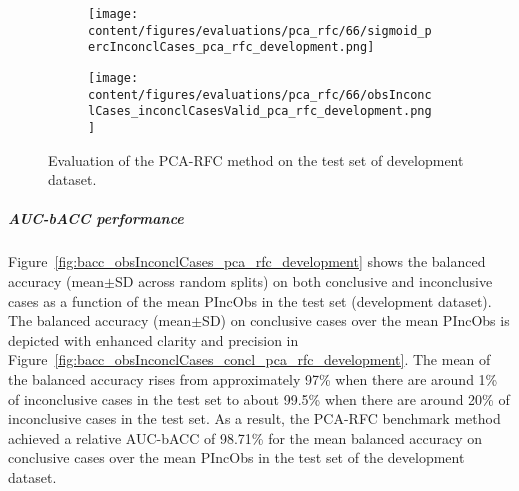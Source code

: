 \begin{figure}[ht]
  \begin{subfigure}{0.48\textwidth}
    \centering
    \texttt{[image: content/figures/evaluations/pca\_rfc/66/sigmoid\_percInconclCases\_pca\_rfc\_development.png]}
    \label{fig:pca_rfc_percInconclCases_development}
  \end{subfigure}
  \hfill
  \begin{subfigure}{0.495\textwidth}
    \centering
    \texttt{[image: content/figures/evaluations/pca\_rfc/66/obsInconclCases\_inconclCasesValid\_pca\_rfc\_development.png]}
    \label{fig:obsInconclCases_inconclCasesValid_pca_rfc_development}
  \end{subfigure}

  \caption{Evaluation of the PCA-RFC method on the test set of development dataset.}
  \label{fig:pca_rfc_dev_fig}
\end{figure}


\subparagraph{AUC-bACC performance}

Figure~\ref{fig:bacc_obsInconclCases_pca_rfc_development} shows the balanced accuracy (mean$\pm$SD across random splits) 
on both conclusive and inconclusive cases as a function of the mean PIncObs
in the test set (development dataset).
The balanced accuracy (mean$\pm$SD) on conclusive cases over the mean PIncObs
is depicted with enhanced clarity and precision in Figure~\ref{fig:bacc_obsInconclCases_concl_pca_rfc_development}.
The mean of the balanced accuracy rises from approximately 97\% 
when there are around 1\% of inconclusive cases in the test set to about 99.5\% 
when there are around 20\% of inconclusive cases in the test set.
As a result, the PCA-RFC benchmark method achieved a relative AUC-bACC of 98.71\% for the mean balanced accuracy on conclusive cases
over the mean PIncObs in the test set of the development dataset.


